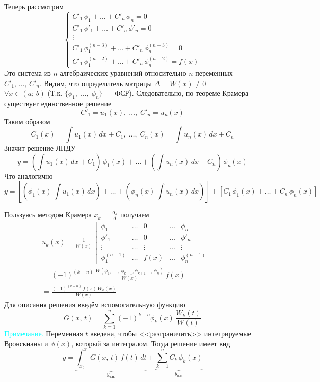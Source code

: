 \begin{Proof}
    Теперь рассмотрим
    \[
        \begin{cases}
            C'_1\,\phi_1 + \dots + C'_n\,\phi_n = 0\\
            C'_1\,\phi'_1 + \dots + C'_n\,\phi'_n = 0\\
            \vdots\\
            C'_1\,\phi^{(n-3)}_1 + \dots + C'_n\,\phi^{(n-3)}_n = 0\\
            C'_1\,\phi^{(n-2)}_1 + \dots + C'_n\,\phi^{(n-2)}_n = f(x)
        \end{cases}
    \]
    Это система из $n$ алгебраических уравнений относительно $n$ переменных $C'_1,\, \dots,\, C'_n$. Видим, что определитель матрицы $\Delta = W(x) \neq 0$\\ $\forall x \in (a;\,b)$ (Т.к. $\{\phi_1,\; \dots,\; \phi_n\}$ --- ФСР). Следовательно, по теореме Крамера существует единственное решение
    \[
        C'_1 = u_1(x),\; \dots,\; C'_n = u_n(x)
    \]
    Таким образом
    \[
        C_1(x) = \int u_1(x)\,dx + C_1,\; \dots,\; C_n(x) = \int u_n(x)\,dx + C_n
    \]
    Значит решение ЛНДУ
    \[
        y = \left(\int u_1(x)\,dx + C_1\right)\,\phi_1(x) + \dots + \left(\int u_n(x)\,dx + C_n\right)\,\phi_n(x)
    \]
    Что аналогично
    \[
        y = \left[\left(\phi_1(x)\, \int u_1(x)\,dx \right) + \dots + \left( \phi_n(x)\, \int u_n(x)\,dx \right) \right] + \left[C_1\,\phi_1(x) + \dots + C_n\,\phi_n(x)\right]
    \]
\end{Proof}

\begin{Note}
    Пользуясь методом Крамера $x_k = \frac{\Delta_k}{\Delta}$ получаем
    \begin{gather*}
        u_k(x) = \frac{1}{W(x)} \, 
        \begin{bmatrix}
            \phi_1 & \dots & 0 & \dots & \phi_n\\
            \phi'_1 & \dots & 0 & \dots & \phi'_n\\
            \vdots & \dots & \vdots & \dots & \vdots\\
            \phi^{(n-1)}_1 & \dots & f(x) & \dots & \phi^{(n-1)}_n
        \end{bmatrix} = \\
        = (-1)^{(k+n)}\, \frac{W(\phi_1,\; \dots,\; \phi_{k - 1}, \phi_{k + 1}\, \dots,\, \phi_n)}{W(x)}\,f(x) = \\
        = \frac{(-1)^{(k+n)}\, f(x)\, W_k(x)}{W(x)}
    \end{gather*}
    Для описания решения введём вспомогательную функцию
    \[
        G(x,\, t) = \sum_{k=1}^{n} (-1)^{k + n} \phi_k(x)\, \frac{W_k(t)}{W(t)}
    \]
    \textcolor{cyan}{Примечание.} Переменная $t$ введена, чтобы <<разграничить>> интегрируемые Вронскианы и $\phi(x)$, который за интегралом.
    Тогда решение имеет вид
    \[
        y = \underbrace{\int_{x_0}^{x}G(x,\,t)\, f(t)\, dt}_{y_\text{ч.н.}} + \underbrace{\sum_{k=1}^{n} C_k\, \phi_k(x)}_{y_\text{о.о.}}
    \]
\end{Note}

